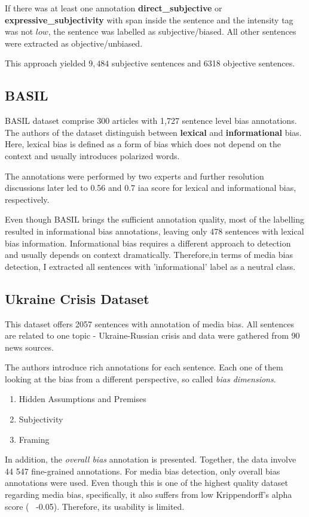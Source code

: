 If there was at least one annotation \textbf{direct\_subjective} or \textbf{expressive\_subjectivity} with span inside the sentence and the intensity tag was not $low$, the sentence was labelled as subjective/biased. All other sentences were extracted as objective/unbiased.

This approach yielded $9,484$ subjective sentences and 6318 objective sentences.




\subsection{BASIL}
BASIL dataset \cite{fan2019plain} comprise 300 articles with 1,727 sentence level bias annotations. The authors of the dataset distinguish between \textbf{lexical} and \textbf{informational} bias. Here, lexical bias is defined as a form of bias which does not depend on the context and usually introduces polarized words.

The annotations were performed by two experts and further resolution discussions later led to 0.56 and 0.7 \Gls{iaa} score for lexical and informational bias, respectively.

Even though BASIL brings the sufficient annotation quality, most of the labelling resulted in informational bias annotations, leaving only 478 sentences with lexical bias information. Informational bias requires a different approach to detection \cite{van2020context} and usually depends on context dramatically. Therefore,in terms of media bias detection, I extracted all sentences with 'informational' label as a neutral class.




\subsection{Ukraine Crisis Dataset}
This dataset \cite{farber2020multidimensional} offers 2057 sentences with annotation of media bias. All sentences are related to one topic - Ukraine-Russian crisis and data were gathered from 90 news sources.

The authors introduce rich annotations for each sentence. Each one of them looking at the bias from a different perspective, so called \textit{bias dimensions}.
\begin{enumerate}
    \item Hidden Assumptions and Premises
    \item Subjectivity
    \item Framing
\end{enumerate}
In addition, the \textit{overall bias} annotation is presented. Together, the data involve 44 547 fine-grained annotations. For media bias detection, only overall bias annotations were used.
Even though this is one of the highest quality dataset regarding media bias, specifically, it also suffers from low Krippendorff’s alpha score (~ -0.05). Therefore, its usability is limited. 




